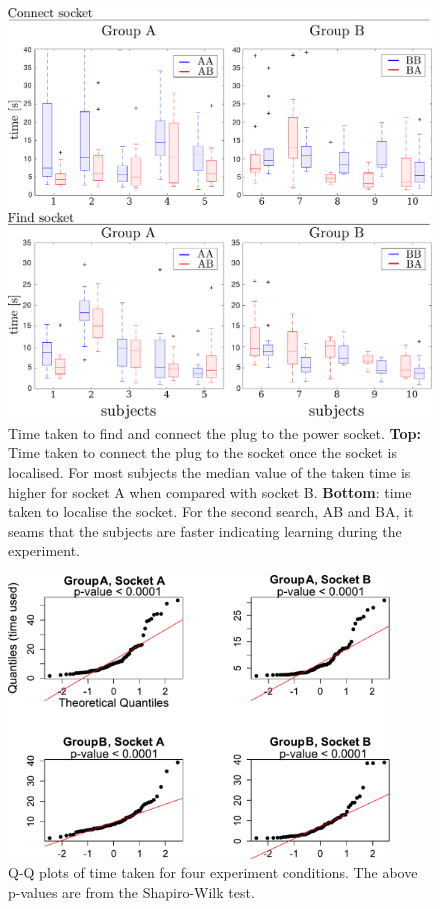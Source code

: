 \begin{appendices}
\begin{figure}
 \centering
 \includegraphics[width=\textwidth]{./ch4-PiH/Figures/time_taken_subgroup.pdf}
 \caption{Time taken to find and connect the plug to the power socket. \textbf{Top:} 
 Time taken to connect the plug to the socket once the socket is localised. For most subjects the median value of the taken time is higher 
 for socket A when compared with socket B. \textbf{Bottom}: time taken to localise the socket. For the second
 search, AB and BA, it seams that the subjects are faster indicating learning during the experiment.
 }
 \label{figuretimesubject}
\end{figure}

\begin{figure}	
   \centering
   \includegraphics[width=0.9\textwidth]{./ch4-PiH/Figures/QQplot.pdf}
   \caption{Q-Q plots of time taken for four experiment conditions. The above p-values are from the Shapiro-Wilk test.}
   \label{QQplot}
\end{figure}



\end{appendices}
